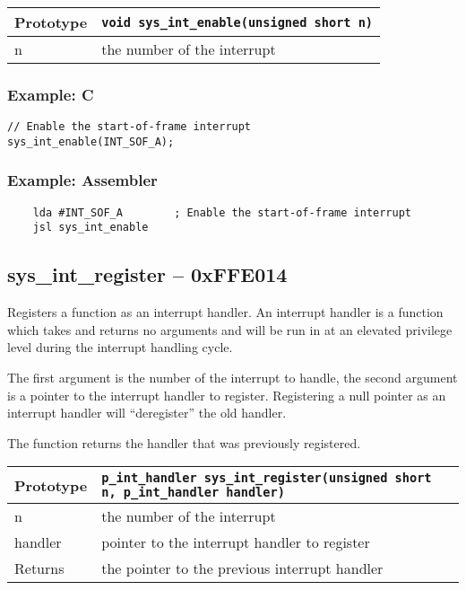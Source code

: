 \bigskip

\begin{tabular}{|l||l|} \hline
Prototype & \lstinline!void sys_int_enable(unsigned short n)! \\ \hline
n & the number of the interrupt \\ \hline
\end{tabular}

\subsubsection*{Example: C}
\begin{lstlisting}
// Enable the start-of-frame interrupt
sys_int_enable(INT_SOF_A);
\end{lstlisting}

\subsubsection*{Example: Assembler}
\begin{verbatim}
    lda #INT_SOF_A        ; Enable the start-of-frame interrupt
    jsl sys_int_enable
\end{verbatim}

\subsection*{sys\_int\_register -- 0xFFE014}
Registers a function as an interrupt handler. An interrupt handler is a function which takes and returns no arguments and will be run in at an elevated privilege level during the interrupt handling cycle.

The first argument is the number of the interrupt to handle, the second argument is a pointer to the interrupt handler to register. Registering a null pointer as an interrupt handler will “deregister” the old handler.

The function returns the handler that was previously registered.

\begin{tabular}{|l||l|} \hline
Prototype & \lstinline!p_int_handler sys_int_register(unsigned short n, p_int_handler handler)! \\ \hline
n & the number of the interrupt \\ \hline
handler & pointer to the interrupt handler to register \\ \hline
Returns & the pointer to the previous interrupt handler \\ \hline
\end{tabular}

